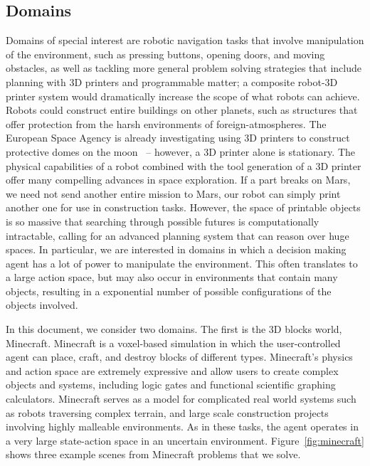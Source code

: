 \documentclass[11pt]{article}
\begin{document}
\subsection{Domains}
Domains of special interest are robotic navigation tasks that involve manipulation of the environment, such as pressing buttons, opening doors, and moving obstacles, as well as tackling more general problem solving strategies that include planning with 3D printers and programmable matter; a composite robot-3D printer system would dramatically increase the scope of what robots can achieve. Robots could construct entire buildings on other planets, such as structures that offer protection from the harsh environments of foreign-atmospheres. The European Space Agency is already investigating using 3D printers to construct protective domes on the moon~\cite{ceccanti20103D,Cesaretti2014430} -- however, a 3D printer alone is stationary. The physical capabilities of a robot combined with the tool generation of a 3D printer offer many compelling advances in space exploration. If a part breaks on Mars, we need not send another entire mission to Mars, our robot can simply print another one for use in construction tasks. However, the space of printable objects is so massive that searching through possible futures is computationally intractable, calling for an advanced planning system that can reason over huge spaces. In particular, we are interested in domains in which a decision making agent has a lot of power to manipulate the environment. This often translates to a large action space, but may also occur in environments that contain many objects, resulting in a exponential number of possible configurations of the objects involved.

In this document, we consider two domains. The first is the 3D blocks world, Minecraft. Minecraft is a voxel-based simulation in which the user-controlled agent can place, craft, and destroy blocks of different types.
Minecraft's physics and action space are extremely expressive and allow users to create complex objects and systems, including logic gates and functional scientific graphing calculators.
Minecraft serves as a model for complicated real world systems such as robots
traversing complex terrain, and large scale construction projects involving highly malleable environments.  As in these tasks, the agent operates in a
very large state-action space in an uncertain environment. Figure~\ref{fig:minecraft} shows three example scenes from Minecraft problems that we solve.
\end{document}
